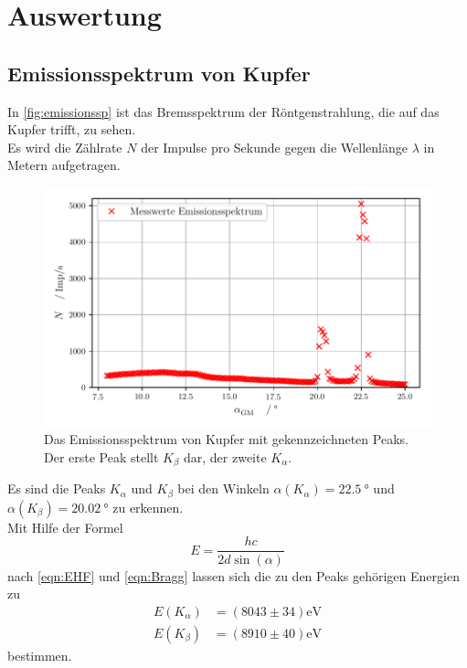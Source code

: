 \section{Auswertung}
\label{sec:Auswertung}
\subsection{Emissionsspektrum von Kupfer}
\label{subsec:spektrumCU}


In \autoref{fig:emissionssp} ist das Bremsspektrum der Röntgenstrahlung, die auf das Kupfer trifft, zu sehen.\\
Es wird die Zählrate $N$ der Impulse pro Sekunde gegen die Wellenlänge $\lambda$ in Metern aufgetragen.\\

\begin{figure}[H]
  \centering
  \includegraphics{build/emissionsspektrum.pdf}
  \caption{Das Emissionsspektrum von Kupfer mit gekennzeichneten Peaks. Der erste Peak stellt $K_{\beta}$ dar, der zweite $K_{\alpha}$.}
  \label{fig:emissionssp}
\end{figure}

\noindent Es sind die Peaks $K_{\alpha}$ und $K_{\beta}$ bei den Winkeln $\alpha(K_{\alpha})= \SI{22,5}{\degree}$ 
und $\alpha(K_{\beta}) = \SI{20,02}{\degree}$ zu erkennen.\\

\noindent Mit Hilfe der Formel
\begin{equation*}
  E = \frac{hc}{2d\sin\left(\alpha\right)}
\end{equation*}
nach \eqref{eqn:EHF} und \eqref{eqn:Bragg} lassen sich die zu den Peaks gehörigen Energien zu
\begin{align*}
  E(K_{\alpha}) &= (8043 \pm 34)\unit{\electronvolt} \\
  E(K_{\beta}) &= (8910 \pm 40)\unit{\electronvolt}
\end{align*}
bestimmen.




